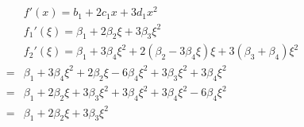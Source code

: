 \documentclass[10pt]{article}
\begin{document}
\begin{align*}&f'(x) = b_1 + 2 c_1 x + 3 d_1 x^2 
\\
&f_1'(\xi) = \beta_1 + 2 \beta_2 \xi + 3 \beta_3 \xi^2
\\
&f_2'(\xi) = \beta_1 + 3 \beta_4 \xi^2 + 2 (\beta_2 - 3 \beta_4 \xi) \xi + 3 (\beta_3 + \beta_4) \xi^2
\\
= &\beta_1 + 3 \beta_4 \xi^2 + 2 \beta_2 \xi - 6 \beta_4 \xi^2 + 3 \beta_3 \xi^2 + 3 \beta_4 \xi^2
\\
= &\beta_1 + 2 \beta_2 \xi + 3 \beta_3 \xi^2 + 3 \beta_4 \xi^2 + 3 \beta_4 \xi^2 - 6 \beta_4 \xi^2 
\\
= &\beta_1 + 2 \beta_2 \xi + 3 \beta_3 \xi^2
\end{align*}
\end{document}
